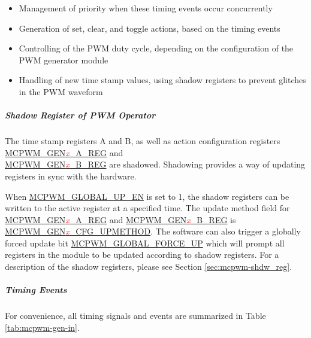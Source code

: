 \documentclass[main\_\_EN.tex]{subfiles}
\begin{document}
\begin{itemize}
\begin{itemize}
        \item DT1: the PWM timer is counting down and FAULT0 detected(field \hyperref[fielddesc:MCPWMGEN0T0SEL]{MCPWM\_GEN\textcolor{red}{\it{x}}\_T1\_SEL} is set to 0) or FAULT1 detected (field \hyperref[fielddesc:MCPWMGEN0T0SEL]{MCPWM\_GEN\textcolor{red}{\it{x}}\_T1\_SEL} is set to 1) or FAULT2 detected (field \hyperref[fielddesc:MCPWMGEN0T0SEL]{MCPWM\_GEN\textcolor{red}{\it{x}}\_T1\_SEL} is set to 2) or synchronized (field \hyperref[fielddesc:MCPWMGEN0T0SEL]{MCPWM\_GEN\textcolor{red}{\it{x}}\_T1\_SEL} is set to 3).
    \end{itemize}
    \item Management of priority when these timing events occur concurrently
    \item Generation of set, clear, and toggle actions, based on the timing events
    \item Controlling of the PWM duty cycle, depending on the configuration of the PWM generator module
    \item Handling of new time stamp values, using shadow registers to prevent glitches in the PWM waveform
\end{itemize}

\subparagraph{Shadow Register of PWM Operator}
The time stamp registers A and B, as well as action configuration registers  \hyperref[regdesc:MCPWMGEN0AREG]{MCPWM\_GEN\textcolor{red}{\it{x}}\_A\_REG} and\\ \hyperref[regdesc:MCPWMGEN0BREG]{MCPWM\_GEN\textcolor{red}{\it{x}}\_B\_REG} are shadowed. Shadowing provides a way of updating registers in sync with the hardware. 

When \hyperref[fielddesc:MCPWMGLOBALUPEN]{MCPWM\_GLOBAL\_UP\_EN} is set to 1, the shadow registers can be written to the active register at a specified time. The update method field for \hyperref[regdesc:MCPWMGEN0AREG]{MCPWM\_GEN\textcolor{red}{\it{x}}\_A\_REG} and \hyperref[regdesc:MCPWMGEN0BREG]{MCPWM\_GEN\textcolor{red}{\it{x}}\_B\_REG} is \hyperref[fielddesc:MCPWMGEN0CFGUPMETHOD]{MCPWM\_GEN\textcolor{red}{\it{x}}\_CFG\_UPMETHOD}. The software can also trigger a globally forced update bit \hyperref[fielddesc:MCPWMGLOBALFORCEUP]{MCPWM\_GLOBAL\_FORCE\_UP} which will prompt all registers in the module to be updated according to shadow registers. For a description of the shadow registers, please see Section \ref{sec:mcpwm-shdw_reg}.

\subparagraph{Timing Events}
For convenience, all timing signals and events are summarized in Table \ref{tab:mcpwm-gen-in}.

\end{document}
